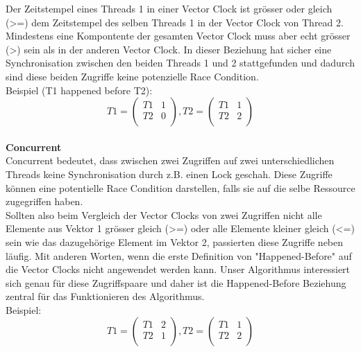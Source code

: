 \documentclass[10pt,a4paper]{article}
\begin{document}
\begin{flushleft}
Der Zeitstempel eines Threads 1 in einer Vector Clock ist grösser oder gleich (>=) dem Zeitstempel des selben Threads 1 in der Vector Clock von Thread 2. Mindestens eine Kompontente der gesamten Vector Clock muss aber echt grösser (>) sein als in der anderen Vector Clock. In dieser Beziehung hat sicher eine Synchronisation zwischen den beiden Threads 1 und 2 stattgefunden und dadurch sind diese beiden Zugriffe keine potenzielle Race Condition.\\
Beispiel (T1 happened before T2):\\
\[
	T1 = \begin{pmatrix}
		T1 & 1\\
		T2 & 0\\
	\end{pmatrix}
	, T2 = \begin{pmatrix}
		T1 & 1\\
		T2 & 2\\
	\end{pmatrix}
\]
\\[0.5cm]
\textbf{Concurrent}\\[0.2cm]
Concurrent bedeutet, dass zwischen zwei Zugriffen auf zwei unterschiedlichen Threads keine Synchronisation durch z.B. einen Lock geschah. Diese Zugriffe können eine potentielle Race Condition darstellen, falls sie auf die selbe Ressource zugegriffen haben.\\
Sollten also beim Vergleich der Vector Clocks von zwei Zugriffen nicht alle Elemente aus Vektor 1 grösser gleich (>=) oder alle Elemente kleiner gleich (<=) sein wie das dazugehörige Element im Vektor 2, passierten diese Zugriffe neben läufig. Mit anderen Worten, wenn die erste Definition von "Happened-Before" auf die Vector Clocks nicht angewendet werden kann. Unser Algorithmus interessiert sich genau für diese Zugriffspaare und daher ist die Happened-Before Beziehung zentral für das Funktionieren des Algorithmus. \\
Beispiel:\\
\[
	T1 = \begin{pmatrix}
		T1 & 2\\
		T2 & 1\\
	\end{pmatrix}
	, T2 = \begin{pmatrix}
		T1 & 1\\
		T2 & 2\\
	\end{pmatrix}
\]
\\[0.5cm]
\end{flushleft}
\end{document}
